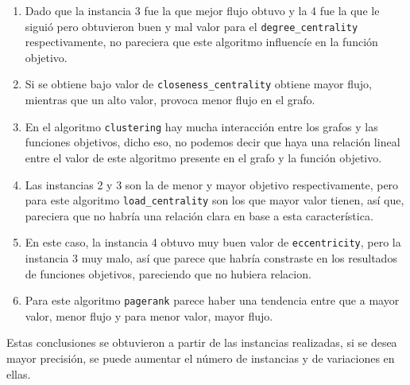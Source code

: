 \documentclass[12pt]{article}
\begin{document}
\begin{enumerate}

\item Dado que  la instancia 3 fue la que mejor flujo obtuvo y la 4 fue la que le siguió pero obtuvieron buen y mal valor para el \texttt{degree\_centrality} respectivamente, no pareciera que este algoritmo influencíe en la función objetivo. 

\item Si se obtiene bajo valor de \texttt{closeness\_centrality} obtiene mayor flujo, mientras que un alto valor, provoca menor flujo en el grafo.

\item En el algoritmo \texttt{clustering} hay mucha interacción entre los grafos y las funciones objetivos, dicho eso, no podemos decir que haya una relación lineal entre el valor de este algoritmo presente en el grafo y la función objetivo.

\item Las instancias 2 y 3 son la de menor y mayor objetivo respectivamente, pero para este algoritmo \texttt{load\_centrality} son los que mayor valor tienen, así que, pareciera que no habría una relación clara en base a esta característica. 

\item En este caso, la instancia 4 obtuvo muy buen valor de \texttt{eccentricity}, pero la instancia 3 muy malo, así que parece que habría constraste en los resultados de funciones objetivos, pareciendo que no hubiera relacion.

\item Para este algoritmo \texttt{pagerank} parece haber una tendencia entre que a mayor valor, menor flujo y para menor valor, mayor flujo. 

\end{enumerate}

Estas conclusiones se obtuvieron a partir de las instancias realizadas, si se desea mayor precisión, se puede aumentar el número de instancias y de variaciones en ellas.

\newpage


\end{document}
